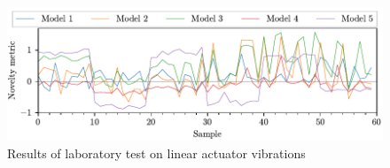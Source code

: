 \begin{figure}
    \includegraphics[width=\linewidth]{images/linear.pdf}
    \caption{Results of laboratory test on linear actuator vibrations}
    \label{fig:linear}
\end{figure}